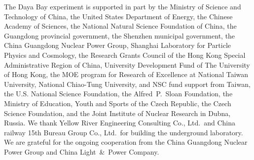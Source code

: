 \documentclass[aps,prl,showpacs,showkeys,amsmath,amssymb,
twocolumn,
floatfix,
superscriptaddress
]{revtex4-1}
\begin{document}
\par
The Daya Bay experiment is supported in part by the Ministry of Science and Technology of China, the United States Department of Energy,  the Chinese Academy of Sciences, the National Natural Science Foundation of China, the Guangdong provincial government, the Shenzhen municipal government,  the China Guangdong Nuclear Power Group, Shanghai Laboratory for Particle Physics and Cosmology, the Research Grants Council of the Hong Kong Special Administrative Region of China, University Development Fund of The University of Hong Kong, the MOE program for Research of Excellence at National Taiwan University, National Chiao-Tung University, and NSC fund support from Taiwan, the U.S. National Science Foundation, the Alfred~P.~Sloan Foundation, the Ministry of Education, Youth and Sports of the Czech Republic, the Czech Science Foundation, and the Joint Institute of Nuclear Research in Dubna, Russia. We thank Yellow River Engineering Consulting Co., Ltd.\ and China railway 15th Bureau Group Co., Ltd.\ for building the underground laboratory. We are grateful for the ongoing cooperation from the China Guangdong Nuclear Power Group and China Light~\&~Power Company.
\end{document}
